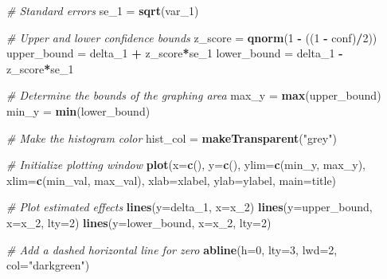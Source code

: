 \documentclass[]{article}
\newenvironment{Shaded}{\begin{snugshade}}{\end{snugshade}}
\newcommand{\KeywordTok}[1]{\textcolor[rgb]{0.13,0.29,0.53}{\textbf{#1}}}
\newcommand{\DataTypeTok}[1]{\textcolor[rgb]{0.13,0.29,0.53}{#1}}
\newcommand{\DecValTok}[1]{\textcolor[rgb]{0.00,0.00,0.81}{#1}}
\newcommand{\StringTok}[1]{\textcolor[rgb]{0.31,0.60,0.02}{#1}}
\newcommand{\CommentTok}[1]{\textcolor[rgb]{0.56,0.35,0.01}{\textit{#1}}}
\newcommand{\OperatorTok}[1]{\textcolor[rgb]{0.81,0.36,0.00}{\textbf{#1}}}
\newcommand{\NormalTok}[1]{#1}
\begin{document}
\begin{Shaded}
\begin{Highlighting}[]
  \CommentTok{# Standard errors}
\NormalTok{  se_}\DecValTok{1}\NormalTok{ =}\StringTok{ }\KeywordTok{sqrt}\NormalTok{(var_}\DecValTok{1}\NormalTok{)}
  
  \CommentTok{# Upper and lower confidence bounds}
\NormalTok{  z_score =}\StringTok{ }\KeywordTok{qnorm}\NormalTok{(}\DecValTok{1} \OperatorTok{-}\StringTok{ }\NormalTok{((}\DecValTok{1} \OperatorTok{-}\StringTok{ }\NormalTok{conf)}\OperatorTok{/}\DecValTok{2}\NormalTok{))}
\NormalTok{  upper_bound =}\StringTok{ }\NormalTok{delta_}\DecValTok{1} \OperatorTok{+}\StringTok{ }\NormalTok{z_score}\OperatorTok{*}\NormalTok{se_}\DecValTok{1}
\NormalTok{  lower_bound =}\StringTok{ }\NormalTok{delta_}\DecValTok{1} \OperatorTok{-}\StringTok{ }\NormalTok{z_score}\OperatorTok{*}\NormalTok{se_}\DecValTok{1}
  
  \CommentTok{# Determine the bounds of the graphing area}
\NormalTok{  max_y =}\StringTok{ }\KeywordTok{max}\NormalTok{(upper_bound)}
\NormalTok{  min_y =}\StringTok{ }\KeywordTok{min}\NormalTok{(lower_bound)}
  
  \CommentTok{# Make the histogram color}
\NormalTok{  hist_col =}\StringTok{ }\KeywordTok{makeTransparent}\NormalTok{(}\StringTok{"grey"}\NormalTok{)}
  
  \CommentTok{# Initialize plotting window}
  \KeywordTok{plot}\NormalTok{(}\DataTypeTok{x=}\KeywordTok{c}\NormalTok{(), }\DataTypeTok{y=}\KeywordTok{c}\NormalTok{(), }\DataTypeTok{ylim=}\KeywordTok{c}\NormalTok{(min_y, max_y), }\DataTypeTok{xlim=}\KeywordTok{c}\NormalTok{(min_val, max_val), }\DataTypeTok{xlab=}\NormalTok{xlabel, }\DataTypeTok{ylab=}\NormalTok{ylabel, }\DataTypeTok{main=}\NormalTok{title)}
  
  \CommentTok{# Plot estimated effects}
  \KeywordTok{lines}\NormalTok{(}\DataTypeTok{y=}\NormalTok{delta_}\DecValTok{1}\NormalTok{, }\DataTypeTok{x=}\NormalTok{x_}\DecValTok{2}\NormalTok{)}
  \KeywordTok{lines}\NormalTok{(}\DataTypeTok{y=}\NormalTok{upper_bound, }\DataTypeTok{x=}\NormalTok{x_}\DecValTok{2}\NormalTok{, }\DataTypeTok{lty=}\DecValTok{2}\NormalTok{)}
  \KeywordTok{lines}\NormalTok{(}\DataTypeTok{y=}\NormalTok{lower_bound, }\DataTypeTok{x=}\NormalTok{x_}\DecValTok{2}\NormalTok{, }\DataTypeTok{lty=}\DecValTok{2}\NormalTok{)}
  
  \CommentTok{# Add a dashed horizontal line for zero}
  \KeywordTok{abline}\NormalTok{(}\DataTypeTok{h=}\DecValTok{0}\NormalTok{, }\DataTypeTok{lty=}\DecValTok{3}\NormalTok{, }\DataTypeTok{lwd=}\DecValTok{2}\NormalTok{, }\DataTypeTok{col=}\StringTok{"darkgreen"}\NormalTok{)}
  

\end{Highlighting}
\end{Shaded}
\end{document}
